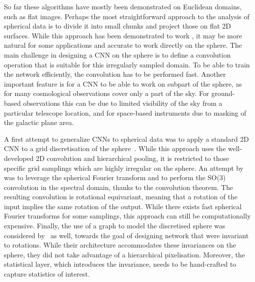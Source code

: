 \documentclass[final,twocolumn,3p,times,authoryear]{elsarticle}
\newcommand{\todo}[1]{{\color[rgb]{.6,.1,.6}{#1}}}
\newcommand{\1}{\b{1}}              %
\newcommand{\0}{\b{0}}              %
\begin{document}
So far these algorithms have mostly been demonstrated on Euclidean domains, such as flat images.
Perhaps the most straightforward approach to the analysis of spherical data is to divide it into small chunks and project those on flat 2D surfaces. \todo{Tune according to the story in the related work.}
While this approach has been demonstrated to work \citep{fluri2018deep,gupta2018nongaussianinformation,schmelze2017cosmologicalmodel,gillet2018deeplearning}, it may be more natural for some applications and accurate to work directly on the sphere.
The main challenge in designing a CNN on the sphere is to define a convolution operation that is suitable for this irregularly sampled domain.
To be able to train the network efficiently, the convolution has to be performed fast.
Another important feature is for a CNN to be able to work on subpart of the sphere, as for many cosmological observations cover only a part of the sky.
For ground-based observations this can be due to limited visibility of the sky from a particular telescope location, and for space-based instruments due to masking of the galactic plane area.

A first attempt to generalize CNNs to spherical data was to apply a standard 2D CNN to a grid discretisation of the sphere~\citep{boomsma2017spherical}. While this approach uses the well-developed 2D convolution and hierarchical pooling, it is restricted to those specific grid samplings which are highly irregular on the sphere.
An attempt by~\citet{cohen2018sphericalcnn} was to leverage the spherical Fourier transform and to perform the SO(3) convolution in the spectral domain, thanks to the convolution theorem.
The resulting convolution is rotational equivariant, meaning that a rotation of the input implies the same rotation of the output.
While there exists fast spherical Fourier transforms for some samplings, this approach can still be computationally expensive.
Finally, the use of a graph to model the discretised sphere was considered by~\citet{khasanova2017graphomni} as well, towards the goal of designing network that were invariant to rotations.
While their architecture accommodates these invariances on the sphere, they did not take advantage of a hierarchical pixelisation.
Moreover, the statistical layer, which introduces the invariance, needs to be hand-crafted to capture statistics of interest.
\todo{better identify the shortcomings: (i) part of sphere / missing data, (ii) computational efficiency, (iii) equivarience}
\end{document}
